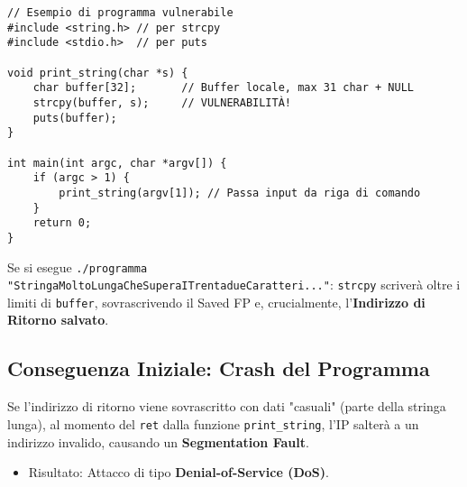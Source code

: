 \begin{verbatim}
// Esempio di programma vulnerabile
#include <string.h> // per strcpy
#include <stdio.h>  // per puts

void print_string(char *s) {
    char buffer[32];       // Buffer locale, max 31 char + NULL
    strcpy(buffer, s);     // VULNERABILITÀ!
    puts(buffer);
}

int main(int argc, char *argv[]) {
    if (argc > 1) {
        print_string(argv[1]); // Passa input da riga di comando
    }
    return 0;
}
\end{verbatim}
Se si esegue \texttt{./programma "StringaMoltoLungaCheSuperaITrentadueCaratteri..."}:
\texttt{strcpy} scriverà oltre i limiti di \texttt{buffer}, sovrascrivendo il Saved FP e, crucialmente, l'\textbf{Indirizzo di Ritorno salvato}.

\subsection{Conseguenza Iniziale: Crash del Programma}
Se l'indirizzo di ritorno viene sovrascritto con dati "casuali" (parte della stringa lunga), al momento del \texttt{ret} dalla funzione \texttt{print\_string}, l'IP salterà a un indirizzo invalido, causando un \textbf{Segmentation Fault}.
\begin{itemize}
    \item Risultato: Attacco di tipo \textbf{Denial-of-Service (DoS)}.
\end{itemize}

